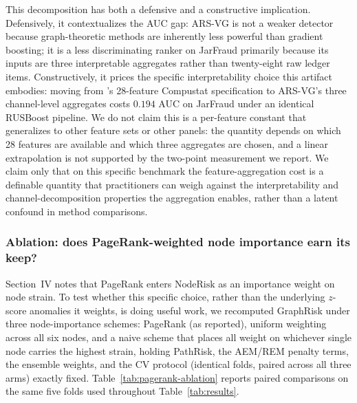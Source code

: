 \documentclass[12pt]{article}
\begin{document}
This decomposition has both a defensive and a constructive implication.
Defensively, it contextualizes the AUC gap: ARS-VG is not a weaker
detector because graph-theoretic methods are inherently less powerful
than gradient boosting; it is a less discriminating ranker on JarFraud
primarily because its inputs are three interpretable aggregates rather
than twenty-eight raw ledger items.  Constructively, it prices the
specific interpretability choice this artifact embodies: moving from
\citet{bao2020}'s 28-feature Compustat specification to ARS-VG's three
channel-level aggregates costs $0.194$ AUC on JarFraud under an
identical RUSBoost pipeline.  We do not claim this is a per-feature
constant that generalizes to other feature sets or other panels: the
quantity depends on which 28 features are available and which
three aggregates are chosen, and a linear extrapolation is not
supported by the two-point measurement we report.  We claim only that
on this specific benchmark the feature-aggregation cost is a definable
quantity that practitioners can weigh against the interpretability
and channel-decomposition properties the aggregation enables, rather
than a latent confound in method comparisons.

\subsubsection*{Ablation: does PageRank-weighted node importance earn its keep?}
\label{subsec:pagerank-ablation}

Section~IV notes that PageRank enters $\text{NodeRisk}$ as an
importance weight on node strain.  To test whether this specific
choice, rather than the underlying $z$-score anomalies it weights, is
doing useful work, we recomputed GraphRisk under three node-importance
schemes: PageRank (as reported), uniform weighting across all six
nodes, and a naive scheme that places all weight on whichever single
node carries the highest strain, holding PathRisk, the AEM/REM
penalty terms, the ensemble weights, and the CV protocol (identical
folds, paired across all three arms) exactly fixed.
Table~\ref{tab:pagerank-ablation} reports paired comparisons on the
same five folds used throughout Table~\ref{tab:results}.
\end{document}
